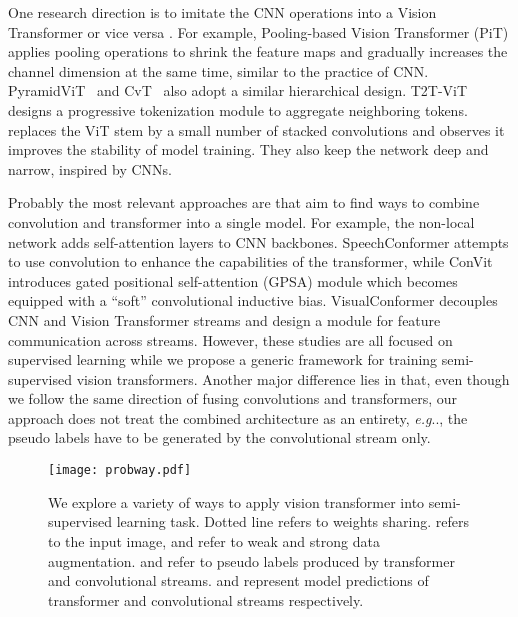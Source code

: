 \documentclass[runningheads]{llncs}
\makeatletter
\DeclareRobustCommand\onedot{\futurelet\@let@token\@onedot}
\def\@onedot{\ifx\@let@token.\else.\null\fi\xspace}
\def\eg{\emph{e.g}\onedot} \def\Eg{\emph{E.g}\onedot}
\makeatother
\begin{document}
One research direction is to imitate the CNN operations into a Vision Transformer or vice versa \cite{heo2021rethinking, yuan2021tokens, xiao2021early, wang2021pyramid}. For example, Pooling-based Vision Transformer (PiT) \cite{heo2021rethinking} applies pooling operations to shrink the feature maps and gradually increases the channel dimension at the same time, similar to the practice of CNN. PyramidViT~\cite{wang2021pyramid} and CvT~\cite{wu2021cvt} also adopt a similar hierarchical design. T2T-ViT \cite{yuan2021tokens} designs a progressive tokenization module to aggregate neighboring tokens. ~\cite{xiao2021early} replaces the ViT stem by a small number of stacked convolutions and observes it improves the stability of model training. They also keep the network deep and narrow, inspired by CNNs.

Probably the most relevant approaches are \cite{wang2018non, d2021convit, gulati2020conformer, peng2021conformer} that aim to find ways to combine convolution and transformer into a single model. For example, the non-local network \cite{wang2018non} adds self-attention layers to CNN backbones. SpeechConformer \cite{gulati2020conformer} attempts to use convolution to enhance the capabilities of the transformer, while ConVit \cite{d2021convit} introduces gated positional self-attention (GPSA) module which becomes equipped with a ``soft'' convolutional inductive bias. VisualConformer \cite{peng2021conformer} decouples CNN and Vision Transformer streams and design a module for feature communication across streams. However, these studies are all focused on supervised learning while we propose a generic framework for training semi-supervised vision transformers. Another major difference lies in that, even though we follow the same direction of fusing convolutions and transformers, our approach does not treat the combined architecture as an entirety, \eg, the pseudo labels have to be generated by the convolutional stream only.






\begin{figure*}[t]
\centering
\texttt{[image: probway.pdf]}
  \caption{We explore a variety of ways to apply vision transformer into semi-supervised learning task. Dotted line refers to weights sharing.  refers to the input image,  and  refer to weak and strong data augmentation.  and  refer to pseudo labels produced by transformer and convolutional streams.  and  represent model predictions of transformer and convolutional streams respectively.}
\label{fig:study}
\end{figure*}
\end{document}
